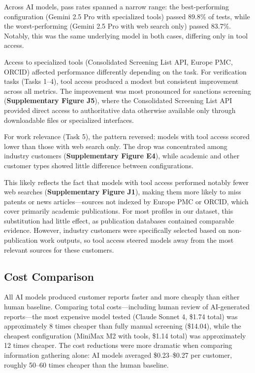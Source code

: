 \documentclass[utf8]{FrontiersinHarvard}
\begin{document}
Across AI models, pass rates spanned a narrow range: the best-performing configuration (Gemini 2.5 Pro with specialized tools) passed 89.8\% of tests, while the worst-performing (Gemini 2.5 Pro with web search only) passed 83.7\%. Notably, this was the same underlying model in both cases, differing only in tool access.

Access to specialized tools (Consolidated Screening List API, Europe PMC, ORCID) affected performance differently depending on the task. For verification tasks (Tasks 1--4), tool access produced a modest but consistent improvement across all metrics. The improvement was most pronounced for sanctions screening (\textbf{Supplementary Figure J5}), where the Consolidated Screening List API provided direct access to authoritative data otherwise available only through downloadable files or specialized interfaces.

For work relevance (Task 5), the pattern reversed: models with tool access scored lower than those with web search only. The drop was concentrated among industry customers (\textbf{Supplementary Figure E4}), while academic and other customer types showed little difference between configurations.

This likely reflects the fact that models with tool access performed notably fewer web searches (\textbf{Supplementary Figure J1}), making them more likely to miss patents or news articles—sources not indexed by Europe PMC or ORCID, which cover primarily academic publications. For most profiles in our dataset, this substitution had little effect, as publication databases contained comparable evidence. However, industry customers were specifically selected based on non-publication work outputs, so tool access steered models away from the most relevant sources for these customers.

\subsection{Cost Comparison}

All AI models produced customer reports faster and more cheaply than either human baseline. Comparing total costs—including human review of AI-generated reports—the most expensive model tested (Claude Sonnet 4, \$1.74 total) was approximately 8 times cheaper than fully manual screening (\$14.04), while the cheapest configuration (MiniMax M2 with tools, \$1.14 total) was approximately 12 times cheaper. The cost reductions were more dramatic when comparing information gathering alone: AI models averaged \$0.23--\$0.27 per customer, roughly 50--60 times cheaper than the human baseline.
\end{document}
